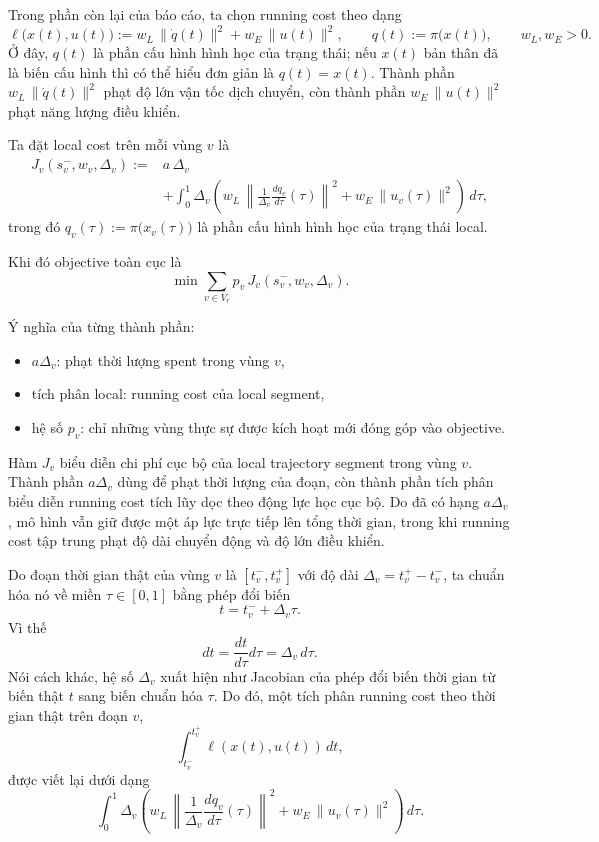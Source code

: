 \documentclass[12pt]{article}
\begin{document}
Trong phần còn lại của báo cáo, ta chọn running cost theo dạng
\begin{equation}
\ell\bigl(x(t),u(t)\bigr)
:=
w_L\,\|\dot q(t)\|^2 + w_E\,\|u(t)\|^2,
\qquad
q(t):=\pi\bigl(x(t)\bigr),
\qquad
w_L,w_E>0.
\label{eq:running_cost_choice}
\end{equation}
Ở đây, $q(t)$ là phần cấu hình hình học của trạng thái; nếu $x(t)$ bản thân đã là biến cấu hình thì có thể hiểu đơn giản là $q(t)=x(t)$. Thành phần $w_L\,\|\dot q(t)\|^2$ phạt độ lớn vận tốc dịch chuyển, còn thành phần $w_E\,\|u(t)\|^2$ phạt năng lượng điều khiển.

Ta đặt local cost trên mỗi vùng $v$ là
\begin{equation}
\begin{aligned}
J_v(s_v^-,w_v,\Delta_v)
:={}& a\,\Delta_v \\
& + \int_0^1 \Delta_v\left(
w_L\,\left\|\frac{1}{\Delta_v}\frac{d q_v}{d\tau}(\tau)\right\|^2
+
w_E\,\|u_v(\tau)\|^2
\right)\,d\tau,
\end{aligned}
\label{eq:local_cost}
\end{equation}
trong đó $q_v(\tau):=\pi\bigl(x_v(\tau)\bigr)$ là phần cấu hình hình học của trạng thái local.

Khi đó objective toàn cục là
\begin{equation}
\min \sum_{v\in V_r} p_v\,J_v(s_v^-,w_v,\Delta_v).
\label{eq:global_cost}
\end{equation}

Ý nghĩa của từng thành phần:
\begin{itemize}
    \item $a\Delta_v$: phạt thời lượng spent trong vùng $v$,
    \item tích phân local: running cost của local segment,
    \item hệ số $p_v$: chỉ những vùng thực sự được kích hoạt mới đóng góp vào objective.
\end{itemize}


Hàm $J_v$ biểu diễn chi phí cục bộ của local trajectory segment trong vùng $v$. Thành phần $a\Delta_v$ dùng để phạt thời lượng của đoạn, còn thành phần tích phân biểu diễn running cost tích lũy dọc theo động lực học cục bộ. Do đã có hạng $a\Delta_v$, mô hình vẫn giữ được một áp lực trực tiếp lên tổng thời gian, trong khi running cost tập trung phạt độ dài chuyển động và độ lớn điều khiển.

Do đoạn thời gian thật của vùng $v$ là $[t_v^-,t_v^+]$ với độ dài $\Delta_v=t_v^+-t_v^-$, ta chuẩn hóa nó về miền $\tau\in[0,1]$ bằng phép đổi biến
\[
t=t_v^-+\Delta_v\tau.
\]
Vì thế
\[
dt=\frac{dt}{d\tau}d\tau=\Delta_v\,d\tau.
\]
Nói cách khác, hệ số $\Delta_v$ xuất hiện như Jacobian của phép đổi biến thời gian từ biến thật $t$ sang biến chuẩn hóa $\tau$. Do đó, một tích phân running cost theo thời gian thật trên đoạn $v$,
\[
\int_{t_v^-}^{t_v^+}\ell(x(t),u(t))\,dt,
\]
được viết lại dưới dạng
\[
\int_0^1 \Delta_v\left(
w_L\,\left\|\frac{1}{\Delta_v}\frac{d q_v}{d\tau}(\tau)\right\|^2
+
w_E\,\|u_v(\tau)\|^2
\right)\,d\tau.
\]
\end{document}
